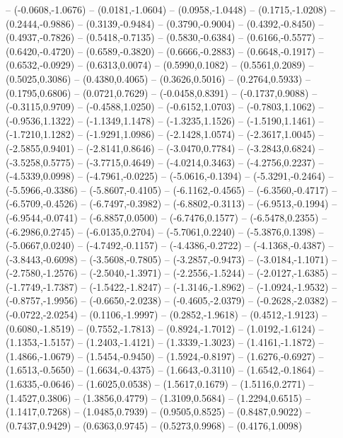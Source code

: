 {	-- (-0.0608,-1.0676)
	-- (0.0181,-1.0604)
	-- (0.0958,-1.0448)
	-- (0.1715,-1.0208)
	-- (0.2444,-0.9886)
	-- (0.3139,-0.9484)
	-- (0.3790,-0.9004)
	-- (0.4392,-0.8450)
	-- (0.4937,-0.7826)
	-- (0.5418,-0.7135)
	-- (0.5830,-0.6384)
	-- (0.6166,-0.5577)
	-- (0.6420,-0.4720)
	-- (0.6589,-0.3820)
	-- (0.6666,-0.2883)
	-- (0.6648,-0.1917)
	-- (0.6532,-0.0929)
	-- (0.6313,0.0074)
	-- (0.5990,0.1082)
	-- (0.5561,0.2089)
	-- (0.5025,0.3086)
	-- (0.4380,0.4065)
	-- (0.3626,0.5016)
	-- (0.2764,0.5933)
	-- (0.1795,0.6806)
	-- (0.0721,0.7629)
	-- (-0.0458,0.8391)
	-- (-0.1737,0.9088)
	-- (-0.3115,0.9709)
	-- (-0.4588,1.0250)
	-- (-0.6152,1.0703)
	-- (-0.7803,1.1062)
	-- (-0.9536,1.1322)
	-- (-1.1349,1.1478)
	-- (-1.3235,1.1526)
	-- (-1.5190,1.1461)
	-- (-1.7210,1.1282)
	-- (-1.9291,1.0986)
	-- (-2.1428,1.0574)
	-- (-2.3617,1.0045)
	-- (-2.5855,0.9401)
	-- (-2.8141,0.8646)
	-- (-3.0470,0.7784)
	-- (-3.2843,0.6824)
	-- (-3.5258,0.5775)
	-- (-3.7715,0.4649)
	-- (-4.0214,0.3463)
	-- (-4.2756,0.2237)
	-- (-4.5339,0.0998)
	-- (-4.7961,-0.0225)
	-- (-5.0616,-0.1394)
	-- (-5.3291,-0.2464)
	-- (-5.5966,-0.3386)
	-- (-5.8607,-0.4105)
	-- (-6.1162,-0.4565)
	-- (-6.3560,-0.4717)
	-- (-6.5709,-0.4526)
	-- (-6.7497,-0.3982)
	-- (-6.8802,-0.3113)
	-- (-6.9513,-0.1994)
	-- (-6.9544,-0.0741)
	-- (-6.8857,0.0500)
	-- (-6.7476,0.1577)
	-- (-6.5478,0.2355)
	-- (-6.2986,0.2745)
	-- (-6.0135,0.2704)
	-- (-5.7061,0.2240)
	-- (-5.3876,0.1398)
	-- (-5.0667,0.0240)
	-- (-4.7492,-0.1157)
	-- (-4.4386,-0.2722)
	-- (-4.1368,-0.4387)
	-- (-3.8443,-0.6098)
	-- (-3.5608,-0.7805)
	-- (-3.2857,-0.9473)
	-- (-3.0184,-1.1071)
	-- (-2.7580,-1.2576)
	-- (-2.5040,-1.3971)
	-- (-2.2556,-1.5244)
	-- (-2.0127,-1.6385)
	-- (-1.7749,-1.7387)
	-- (-1.5422,-1.8247)
	-- (-1.3146,-1.8962)
	-- (-1.0924,-1.9532)
	-- (-0.8757,-1.9956)
	-- (-0.6650,-2.0238)
	-- (-0.4605,-2.0379)
	-- (-0.2628,-2.0382)
	-- (-0.0722,-2.0254)
	-- (0.1106,-1.9997)
	-- (0.2852,-1.9618)
	-- (0.4512,-1.9123)
	-- (0.6080,-1.8519)
	-- (0.7552,-1.7813)
	-- (0.8924,-1.7012)
	-- (1.0192,-1.6124)
	-- (1.1353,-1.5157)
	-- (1.2403,-1.4121)
	-- (1.3339,-1.3023)
	-- (1.4161,-1.1872)
	-- (1.4866,-1.0679)
	-- (1.5454,-0.9450)
	-- (1.5924,-0.8197)
	-- (1.6276,-0.6927)
	-- (1.6513,-0.5650)
	-- (1.6634,-0.4375)
	-- (1.6643,-0.3110)
	-- (1.6542,-0.1864)
	-- (1.6335,-0.0646)
	-- (1.6025,0.0538)
	-- (1.5617,0.1679)
	-- (1.5116,0.2771)
	-- (1.4527,0.3806)
	-- (1.3856,0.4779)
	-- (1.3109,0.5684)
	-- (1.2294,0.6515)
	-- (1.1417,0.7268)
	-- (1.0485,0.7939)
	-- (0.9505,0.8525)
	-- (0.8487,0.9022)
	-- (0.7437,0.9429)
	-- (0.6363,0.9745)
	-- (0.5273,0.9968)
	-- (0.4176,1.0098)
}
